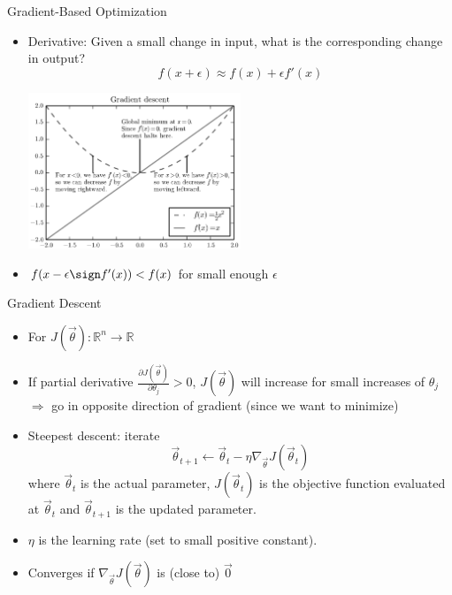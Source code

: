 \begin{vbframe}{Gradient-Based Optimization}

\vfill

\begin{itemize}
\item Derivative: Given a small change in input, what is the corresponding change in output?
$$f(x + \epsilon) \approx f(x) + \epsilon f'(x) $$
\begin{center}
\includegraphics[width = 0.5\textwidth]{./figure/gradient_descent}
\end{center}
\item $f(x - \epsilon \sign f'(x)) < f(x)$ for small enough $\epsilon$
\end{itemize}

\vfill

\end{vbframe}



\begin{vbframe}{Gradient Descent}

\vfill

\begin{itemize}
\item For $J(\vec \theta): \mathbb{R}^n \to \mathbb{R}$\\
\item If partial derivative $\frac{\partial J(\vec \theta)}{\partial \theta_j} > 0$, $J(\vec \theta)$ will increase for small increases of $\theta_j$\\
$\Rightarrow$ go in opposite direction of gradient (since we want to minimize)
\item Steepest descent: iterate
$$\vec \theta_{t+1} \leftarrow \vec \theta_t - \eta \nabla_{\vec \theta} J(\vec \theta_t)$$
where $\vec\theta_t$ is the actual parameter, $J(\vec \theta_t)$ is the objective function evaluated at $\vec\theta_t$
and $\vec\theta_{t+1}$ is the updated parameter.
\item $\eta$ is the learning rate (set to small positive constant).
\item Converges if $\nabla_{\vec \theta} J(\vec \theta)$ is (close to) $\vec 0$
\end{itemize}

\vfill

\end{vbframe}


